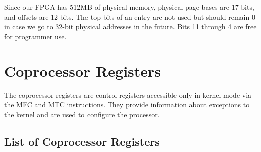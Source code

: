 \documentclass[11pt,openany]{report}
\begin{document}
Since our FPGA has 512MB of physical memory, physical page bases are 17 bits, and offsets are 12 bits. The top bits of an entry are not used but should remain 0 in case we go to 32-bit physical addresses in the future. Bits 11 through 4 are free for programmer use.

\section{Coprocessor Registers}
\label{sec:cpregs}

The coprocessor registers are control registers accessible only in kernel mode via the MFC and MTC instructions. They provide information about exceptions to the kernel and are used to configure the processor. 

\subsection{List of Coprocessor Registers}
\end{document}

